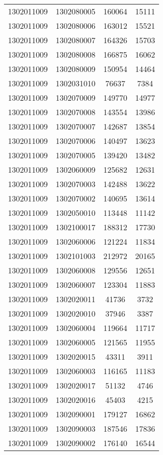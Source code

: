 \begin{longtable}[h]{llcc}
		1302011009 & 1302080005 & 160064 & 15111\\
		1302011009 & 1302080006 & 163012 & 15521\\
		1302011009 & 1302080007 & 164326 & 15703\\
		1302011009 & 1302080008 & 166875 & 16062\\
		1302011009 & 1302080009 & 150954 & 14464\\
		1302011009 & 1302031010 & 76637 & 7384\\
		1302011009 & 1302070009 & 149770 & 14977\\
		1302011009 & 1302070008 & 143554 & 13986\\
		1302011009 & 1302070007 & 142687 & 13854\\
		1302011009 & 1302070006 & 140497 & 13623\\
		1302011009 & 1302070005 & 139420 & 13482\\
		1302011009 & 1302060009 & 125682 & 12631\\
		1302011009 & 1302070003 & 142488 & 13622\\
		1302011009 & 1302070002 & 140695 & 13614\\
		1302011009 & 1302050010 & 113448 & 11142\\
		1302011009 & 1302100017 & 188312 & 17730\\
		1302011009 & 1302060006 & 121224 & 11834\\
		1302011009 & 1302101003 & 212972 & 20165\\
		1302011009 & 1302060008 & 129556 & 12651\\
		1302011009 & 1302060007 & 123304 & 11883\\
		1302011009 & 1302020011 & 41736 & 3732\\
		1302011009 & 1302020010 & 37946 & 3387\\
		1302011009 & 1302060004 & 119664 & 11717\\
		1302011009 & 1302060005 & 121565 & 11955\\
		1302011009 & 1302020015 & 43311 & 3911\\
		1302011009 & 1302060003 & 116165 & 11183\\
		1302011009 & 1302020017 & 51132 & 4746\\
		1302011009 & 1302020016 & 45403 & 4215\\
		1302011009 & 1302090001 & 179127 & 16862\\
		1302011009 & 1302090003 & 187546 & 17836\\
		1302011009 & 1302090002 & 176140 & 16544\\

\end{longtable}
